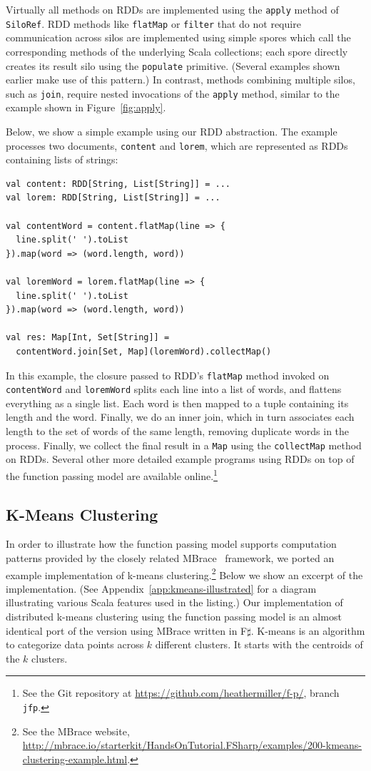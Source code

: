 \documentclass{jfp1}
\begin{document}
Virtually all methods on RDDs are implemented using the \verb|apply|
method of \verb|SiloRef|. RDD methods like \verb|flatMap| or
\verb|filter| that do not require communication across silos are
implemented using simple spores which call the corresponding methods
of the underlying Scala collections; each spore directly creates its
result silo using the \verb|populate| primitive. (Several examples
shown earlier make use of this pattern.) In contrast, methods
combining multiple silos, such as \verb|join|, require nested
invocations of the \verb|apply| method, similar to the example shown
in Figure~\ref{fig:apply}.

Below, we show a simple example using our RDD abstraction. The example
processes two documents, \verb|content| and \verb|lorem|, which are
represented as RDDs containing lists of strings:

\begin{lstlisting}
val content: RDD[String, List[String]] = ...
val lorem: RDD[String, List[String]] = ...

val contentWord = content.flatMap(line => {
  line.split(' ').toList
}).map(word => (word.length, word))

val loremWord = lorem.flatMap(line => {
  line.split(' ').toList
}).map(word => (word.length, word))

val res: Map[Int, Set[String]] =
  contentWord.join[Set, Map](loremWord).collectMap()
\end{lstlisting}
\noindent
In this example, the closure passed to RDD's \verb|flatMap| method
invoked on \verb|contentWord| and \verb|loremWord| splits each line
into a list of words, and flattens everything as a single list. Each
word is then mapped to a tuple containing its length and the
word. Finally, we do an inner join, which in turn associates each
length to the set of words of the same length, removing duplicate
words in the process. Finally, we collect the final result in a
\verb|Map| using the \verb|collectMap| method on RDDs. Several other
more detailed example programs using RDDs on top of the function
passing model are available online.\footnote{See the Git repository at
  \url{https://github.com/heathermiller/f-p/}, branch \texttt{jfp}.}

\subsection{K-Means Clustering}\label{sec:mbrace}

In order to illustrate how the function passing model supports
computation patterns provided by the closely related MBrace~\cite{MBrace} framework,
we ported an example implementation of k-means
clustering.\footnote{See the MBrace website,
  \url{http://mbrace.io/starterkit/HandsOnTutorial.FSharp/examples/200-kmeans-clustering-example.html}.}
Below we show an excerpt of the implementation. (See
Appendix~\ref{app:kmeans-illustrated} for a diagram illustrating
various Scala features used in the listing.) Our implementation of
distributed k-means clustering using the function passing model is an
almost identical port of the version using MBrace written in
F$\sharp$. K-means is an algorithm to categorize data points across
$k$ different clusters. It starts with the centroids of the $k$
clusters.
\end{document}
